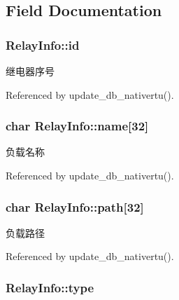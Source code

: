 \subsection{Field Documentation}
\hypertarget{structRelayInfo_a664b6fde886aa5ec22584d57805989ba}{
\subsubsection[{id}]{ Relay\-Info\-::id}}\label{structRelayInfo_a664b6fde886aa5ec22584d57805989ba}


继电器序号 



Referenced by update\-\_\-db\-\_\-nativertu().

\hypertarget{structRelayInfo_a560c82273099e57eee9c873de36ec4d9}{
\subsubsection[{name}]{\setlength{\rightskip}{0pt plus 5cm}char Relay\-Info\-::name\mbox{[}32\mbox{]}}}\label{structRelayInfo_a560c82273099e57eee9c873de36ec4d9}


负载名称 



Referenced by update\-\_\-db\-\_\-nativertu().

\hypertarget{structRelayInfo_a9135480956d928283d45f91635aeefa1}{
\subsubsection[{path}]{\setlength{\rightskip}{0pt plus 5cm}char Relay\-Info\-::path\mbox{[}32\mbox{]}}}\label{structRelayInfo_a9135480956d928283d45f91635aeefa1}


负载路径 



Referenced by update\-\_\-db\-\_\-nativertu().

\hypertarget{structRelayInfo_a1f47e160c39504214a046234af05ff26}{
\subsubsection[{type}]{ Relay\-Info\-::type}}\label{structRelayInfo_a1f47e160c39504214a046234af05ff26}


